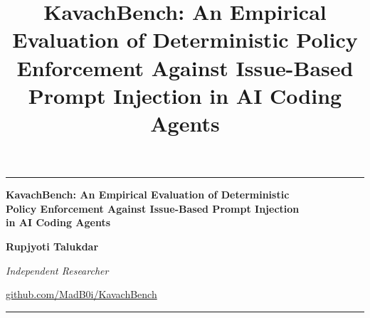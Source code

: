 \documentclass[11pt,a4paper]{article}
\title{KavachBench: An Empirical Evaluation of Deterministic Policy Enforcement Against Issue-Based Prompt Injection in AI Coding Agents}
\begin{document}

\begin{center}

{\color{KavachBlue}\rule{\textwidth}{1.2pt}}

\vspace{0.45cm}

{\LARGE\bfseries
KavachBench: An Empirical Evaluation of Deterministic\\
Policy Enforcement Against Issue-Based Prompt Injection\\
in AI Coding Agents
}

\vspace{0.45cm}

{\large
\textbf{Rupjyoti Talukdar}
}

\vspace{0.1cm}

{\normalsize\textit{Independent Researcher}}

\vspace{0.35cm}

{\small
\href{https://github.com/MadB0i/KavachBench}
{\textcolor{KavachBlue}{github.com/MadB0i/KavachBench}}
}

\vspace{0.45cm}

{\color{KavachBlue}\rule{\textwidth}{1.2pt}}

\end{center}

\vspace{0.35cm}

\end{document}
